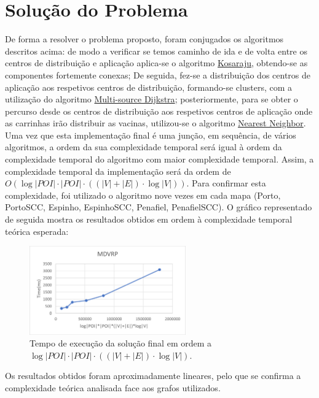 \documentclass[12pt,a4paper]{report}
\begin{document}
\section{Solução do Problema}
De forma a resolver o problema proposto, foram conjugados os algoritmos descritos acima: de modo a verificar se temos caminho de ida e de volta entre
os centros de distribuição e aplicação aplica-se o algoritmo \hyperref[algo:kosaraju]{Kosaraju}, obtendo-se as componentes fortemente conexas; De seguida, fez-se 
a distribuição dos centros de aplicação aos respetivos centros de distribuição, formando-se clusters, com a utilização do algoritmo \hyperref[algo:msdijkstra]{Multi-source Dijkstra};
posteriormente, para se obter o percurso desde os centros de distribuição aos respetivos centros de aplicação onde as carrinhas irão distribuir as vacinas,
utilizou-se o algoritmo \hyperref[algo:nn]{Nearest Neighbor}.
Uma vez que esta implementação final é uma junção, em sequência, de vários algoritmos, a ordem da sua complexidade temporal será igual à ordem da complexidade temporal
do algoritmo com maior complexidade temporal. Assim, a complexidade temporal da implementação será da ordem de \( O(\log|POI| \cdot |POI| \cdot ((|V| + |E|)\cdot \log|V|)) \).
Para confirmar esta complexidade, foi utilizado o algoritmo nove vezes em cada mapa (Porto, PortoSCC, Espinho, EspinhoSCC, Penafiel, PenafielSCC).
O gráfico representado de seguida mostra os resultados obtidos em ordem à complexidade temporal teórica esperada:

\begin{figure}[H]
	\includegraphics[width=0.6\textwidth]{./imgs/charts/MDVRPTimeComplexity.png}
	\centering
	\caption{Tempo de execução da solução final em ordem a $\log|POI| \cdot |POI| \cdot ((|V| + |E|)\cdot \log|V|)$.}
\end{figure}

Os resultados obtidos foram aproximadamente lineares, pelo que se confirma a complexidade teórica analisada
face aos grafos utilizados.
\end{document}

